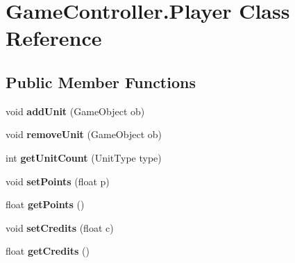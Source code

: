 \hypertarget{class_game_controller_1_1_player}{}\section{Game\+Controller.\+Player Class Reference}
\label{class_game_controller_1_1_player}
\subsection*{Public Member Functions}
\begin{DoxyCompactItemize}
\item 
\hypertarget{class_game_controller_1_1_player_ab1bb535287a6effa0bf6062541491782}{}void {\bfseries add\+Unit} (Game\+Object ob)\label{class_game_controller_1_1_player_ab1bb535287a6effa0bf6062541491782}

\item 
\hypertarget{class_game_controller_1_1_player_a2583776006e097e47a62704dc2cd1520}{}void {\bfseries remove\+Unit} (Game\+Object ob)\label{class_game_controller_1_1_player_a2583776006e097e47a62704dc2cd1520}

\item 
\hypertarget{class_game_controller_1_1_player_a9736a162383edd80db08b704db75c6ba}{}int {\bfseries get\+Unit\+Count} (Unit\+Type type)\label{class_game_controller_1_1_player_a9736a162383edd80db08b704db75c6ba}

\item 
\hypertarget{class_game_controller_1_1_player_a52084561e9cb975d963c444af033c479}{}void {\bfseries set\+Points} (float p)\label{class_game_controller_1_1_player_a52084561e9cb975d963c444af033c479}

\item 
\hypertarget{class_game_controller_1_1_player_ac758424ac07c5cc7205bad34ed071e8e}{}float {\bfseries get\+Points} ()\label{class_game_controller_1_1_player_ac758424ac07c5cc7205bad34ed071e8e}

\item 
\hypertarget{class_game_controller_1_1_player_a56a46f8663199c0b25608f10d168512a}{}void {\bfseries set\+Credits} (float c)\label{class_game_controller_1_1_player_a56a46f8663199c0b25608f10d168512a}

\item 
\hypertarget{class_game_controller_1_1_player_a7699a0b5104492b29d3eabab0395c850}{}float {\bfseries get\+Credits} ()\label{class_game_controller_1_1_player_a7699a0b5104492b29d3eabab0395c850}

\end{DoxyCompactItemize}
